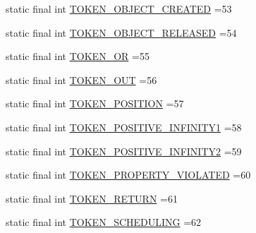 \begin{DoxyCompactItemize}
static final int \hyperlink{classgov_1_1nasa_1_1jpf_1_1inspector_1_1server_1_1expression_1_1parser_1_1_expression_grammar_lexer_ad2e5e3041a237f7be7033d43e181a16d}{T\+O\+K\+E\+N\+\_\+\+O\+B\+J\+E\+C\+T\+\_\+\+C\+R\+E\+A\+T\+ED} =53
\item 
static final int \hyperlink{classgov_1_1nasa_1_1jpf_1_1inspector_1_1server_1_1expression_1_1parser_1_1_expression_grammar_lexer_a74e3df56692137c1f186630d6f0b3bf4}{T\+O\+K\+E\+N\+\_\+\+O\+B\+J\+E\+C\+T\+\_\+\+R\+E\+L\+E\+A\+S\+ED} =54
\item 
static final int \hyperlink{classgov_1_1nasa_1_1jpf_1_1inspector_1_1server_1_1expression_1_1parser_1_1_expression_grammar_lexer_a0f3f73490921daa43e1d444a96a2fe6c}{T\+O\+K\+E\+N\+\_\+\+OR} =55
\item 
static final int \hyperlink{classgov_1_1nasa_1_1jpf_1_1inspector_1_1server_1_1expression_1_1parser_1_1_expression_grammar_lexer_a4cf7357a4e40d31d3969471fdd1c8b70}{T\+O\+K\+E\+N\+\_\+\+O\+UT} =56
\item 
static final int \hyperlink{classgov_1_1nasa_1_1jpf_1_1inspector_1_1server_1_1expression_1_1parser_1_1_expression_grammar_lexer_a17a4709342421cbe30cab57749a75be4}{T\+O\+K\+E\+N\+\_\+\+P\+O\+S\+I\+T\+I\+ON} =57
\item 
static final int \hyperlink{classgov_1_1nasa_1_1jpf_1_1inspector_1_1server_1_1expression_1_1parser_1_1_expression_grammar_lexer_a5f46f1639370804059099a3fa519af36}{T\+O\+K\+E\+N\+\_\+\+P\+O\+S\+I\+T\+I\+V\+E\+\_\+\+I\+N\+F\+I\+N\+I\+T\+Y1} =58
\item 
static final int \hyperlink{classgov_1_1nasa_1_1jpf_1_1inspector_1_1server_1_1expression_1_1parser_1_1_expression_grammar_lexer_aaa0d409c7502eeeabfe97400a29b5346}{T\+O\+K\+E\+N\+\_\+\+P\+O\+S\+I\+T\+I\+V\+E\+\_\+\+I\+N\+F\+I\+N\+I\+T\+Y2} =59
\item 
static final int \hyperlink{classgov_1_1nasa_1_1jpf_1_1inspector_1_1server_1_1expression_1_1parser_1_1_expression_grammar_lexer_a169beebfba39ef6a8910a3e92b43877a}{T\+O\+K\+E\+N\+\_\+\+P\+R\+O\+P\+E\+R\+T\+Y\+\_\+\+V\+I\+O\+L\+A\+T\+ED} =60
\item 
static final int \hyperlink{classgov_1_1nasa_1_1jpf_1_1inspector_1_1server_1_1expression_1_1parser_1_1_expression_grammar_lexer_a6b8a228bb719189198a7bdca18e1f5d2}{T\+O\+K\+E\+N\+\_\+\+R\+E\+T\+U\+RN} =61
\item 
static final int \hyperlink{classgov_1_1nasa_1_1jpf_1_1inspector_1_1server_1_1expression_1_1parser_1_1_expression_grammar_lexer_a6c8b4ee86e392bf35009dc55619c3494}{T\+O\+K\+E\+N\+\_\+\+S\+C\+H\+E\+D\+U\+L\+I\+NG} =62

\end{DoxyCompactItemize}
